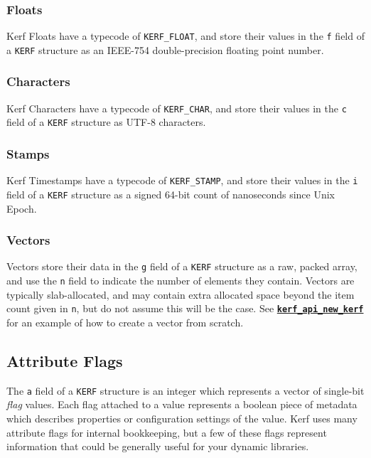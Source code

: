 \documentclass{article}
\newcommand{\ffi}[2]{\hyperref[ffi:#2]{\textbf{\texttt{#1}}}}
\begin{document}
\subsubsection{Floats}
Kerf Floats have a typecode of \texttt{KERF\_FLOAT}, and store their values in the \texttt{f} field of a \texttt{KERF} structure as an IEEE-754 double-precision floating point number.

\subsubsection{Characters}
Kerf Characters have a typecode of \texttt{KERF\_CHAR}, and store their values in the \texttt{c} field of a \texttt{KERF} structure as UTF-8 characters.

\subsubsection{Stamps}
Kerf Timestamps have a typecode of \texttt{KERF\_STAMP}, and store their values in the \texttt{i} field of a \texttt{KERF} structure as a signed 64-bit count of nanoseconds since Unix Epoch.

\subsubsection{Vectors}
Vectors store their data in the \texttt{g} field of a \texttt{KERF} structure as a raw, packed array, and use the \texttt{n} field to indicate the number of elements they contain. Vectors are typically slab-allocated, and may contain extra allocated space beyond the item count given in \texttt{n}, but do not assume this will be the case. See \ffi{kerf\_api\_new\_kerf}{kerfApiNewKerf} for an example of how to create a vector from scratch.

\pagebreak
\subsection{Attribute Flags}
The \texttt{a} field of a \texttt{KERF} structure is an integer which represents a vector of single-bit \emph{flag} values. Each flag attached to a value represents a boolean piece of metadata which describes properties or configuration settings of the value. Kerf uses many attribute flags for internal bookkeeping, but a few of these flags represent information that could be generally useful for your dynamic libraries.

\vspace{0.5cm}
\end{document}
